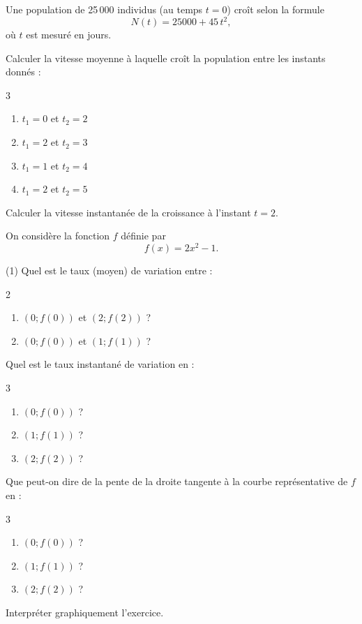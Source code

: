 \documentclass[a4paper,12pt]{article}
\begin{document}
\begin{activite}
	\tcblower

Une population de 25\,000 individus (au temps $t=0$) croît selon la formule
\[
  N(t)
  = 25000 + 45\,t^2,
\]
où $t$ est mesuré en jours.

\begin{tasks}
  \task Calculer la vitesse moyenne à laquelle croît la population entre les instants donnés :
  \begin{multicols}{3}	
    \begin{enumerate}
      \item $t_1 = 0$ et $t_2 = 2$
      \item $t_1 = 2$ et $t_2 = 3$
      \item $t_1 = 1$ et $t_2 = 4$
      \item $t_1 = 2$ et $t_2 = 5$
    \end{enumerate}
\end{multicols}
  \task Calculer la vitesse instantanée de la croissance à l’instant $\displaystyle t = 2$.
\end{tasks}
\end{activite}

\begin{activite}
\tcblower
On considère la fonction $f$ définie par
\[
  f(x) = 2x^2 - 1.
\]

\begin{tasks}(1)
  \task Quel est le taux (moyen) de variation entre :
  \begin{multicols}{2}	
    \begin{enumerate}
      \item $(0; f(0))$ et $(2; f(2))$ ?
      \item $(0; f(0))$ et $(1; f(1))$ ?
    \end{enumerate}
  \end{multicols}
  \task Quel est le taux instantané de variation en :
  \begin{multicols}{3}	
    \begin{enumerate}
      \item $(0; f(0))$ ?
      \item $(1; f(1))$ ?
      \item $(2; f(2))$ ?
    \end{enumerate}
  \end{multicols}
  \task Que peut-on dire de la pente de la droite tangente à la courbe représentative de $f$ en :
  \begin{multicols}{3}	
    \begin{enumerate}
      \item $(0; f(0))$ ?
      \item $(1; f(1))$ ?
      \item $(2; f(2))$ ?
    \end{enumerate}
\end{multicols}
\end{tasks}

Interpréter graphiquement l’exercice.
\end{activite}
\end{document}
